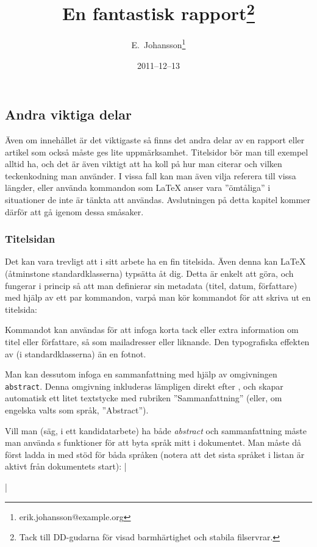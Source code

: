 \documentclass[lang=sv,ptsize=10pt,font=none,nomath,titles=bf,../../a4.tex]{subfiles}
\begin{document}
\subsection{Andra viktiga delar}
Även om innehållet är det viktigaste så finns det andra delar av en
rapport eller artikel som också måste ges lite uppmärksamhet.
Titelsidor bör man till exempel alltid ha, och det är även viktigt att ha 
koll på
hur man citerar och vilken teckenkodning man använder. I vissa fall
kan man även vilja referera till vissa längder, eller använda kommandon
som \LaTeX{} anser vara ”ömtåliga” i situationer de inte är tänkta att
användas. Avslutningen på detta kapitel kommer därför att gå igenom dessa
småsaker.

\subsubsection{Titelsidan}%
Det kan vara trevligt att i sitt arbete ha en fin titelsida. Även denna
kan \LaTeX{} (åtminstone standardklasserna) typsätta åt dig. Detta är
enkelt att göra, och fungerar i princip så att man definierar sin
metadata (titel, datum, författare) med hjälp av ett par kommandon, varpå
man kör kommandot  för att skriva ut en titelsida:
\begin{latexcode}
\title{En fantastisk rapport\thanks{Tack till DD-gudarna
   för visad barmhärtighet och stabila filservrar.}}
\date{2011--12--13}
\author{E.~Johansson\thanks{erik.johansson@example.org}}
\maketitle
\end{latexcode}

Kommandot  kan användas för att infoga korta tack eller extra
information om titel eller författare, så som mailadresser eller
liknande. Den typografiska effekten av  (i standardklasserna)
än en fotnot.

Man kan dessutom infoga en sammanfattning  med hjälp av
omgivningen \texttt{abstract}. Denna omgivning inkluderas lämpligen direkt
efter , och skapar automatisk ett litet textstycke med
rubriken ”Sammanfattning” (eller, om engelska valts som språk,
”Abstract”).

Vill man (säg, i ett kandidatarbete) ha både \emph{abstract} och
sammanfattning måste man använda s funktioner för att byta
språk mitt i dokumentet. Man måste då först ladda in  med stöd 
för båda språken (notera att det sista språket i listan är aktivt från
dokumentets start):
\latex|\usepackage[english,swedish]{babel}|
\end{document}
